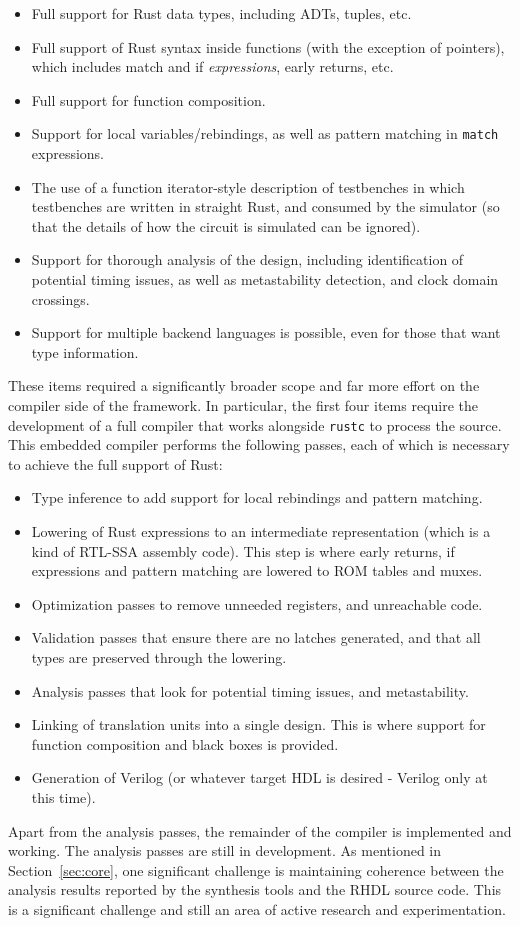 \documentclass[conference]{IEEEtran}
\begin{document}
\begin{itemize}
  \item Full support for Rust data types, including ADTs, tuples, etc.
  \item Full support of Rust syntax inside functions (with the exception of pointers), which includes 
  match and if \emph{expressions}, early returns, etc.
  \item Full support for function composition.
  \item Support for local variables/rebindings, as well as pattern matching in \verb|match| expressions.
  \item The use of a function iterator-style description of testbenches in which testbenches are written in 
  straight Rust, and consumed by the simulator (so that the details of how the circuit is simulated can be ignored).
  \item Support for thorough analysis of the design, including identification of potential timing issues, as well as
  metastability detection, and clock domain crossings.
  \item Support for multiple backend languages is possible, even for those that want type information.
\end{itemize}

These items required a significantly broader scope and far more effort on the compiler side of the framework.  In particular,
the first four items require the development of a full compiler that works alongside \verb|rustc| to process the source. 
This embedded compiler performs the following passes, each of which is necessary to achieve the full support of Rust:
\begin {itemize}
  \item Type inference to add support for local rebindings and pattern matching.
  \item Lowering of Rust expressions to an intermediate representation (which is a kind of RTL-SSA assembly code).  This
  step is where early returns, if expressions and pattern matching are lowered to ROM tables and muxes.
  \item Optimization passes to remove unneeded registers, and unreachable code.
  \item Validation passes that ensure there are no latches generated, and that all types are preserved through the lowering.
  \item Analysis passes that look for potential timing issues, and metastability.
  \item Linking of translation units into a single design.  This is where support for function composition and black boxes is
  provided.
  \item Generation of Verilog (or whatever target HDL is desired - Verilog only at this time).
\end{itemize}
Apart from the analysis passes, the remainder of the compiler is implemented and working.  The analysis passes are still in
development.  As mentioned in Section~\ref{sec:core}, one significant challenge is maintaining coherence between the analysis 
results reported by the synthesis tools and the RHDL source code.  This is a significant challenge and still an area of 
active research and experimentation.
\end{document}
